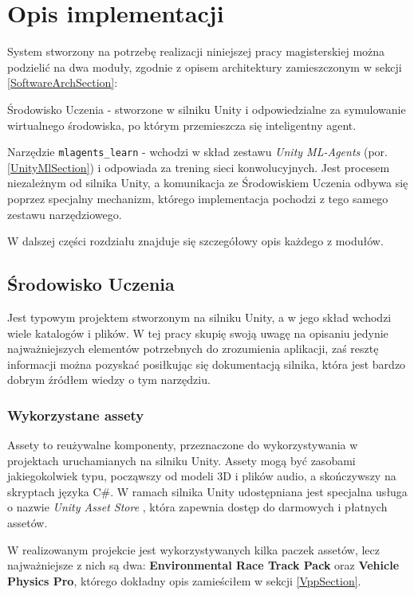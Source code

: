 \chapter{Opis implementacji}
\label{ImplementationChapter}
System stworzony na potrzebę realizacji niniejszej pracy magisterskiej można podzielić na dwa moduły, zgodnie z opisem architektury zamieszczonym w sekcji \ref{SoftwareArchSection}:
\begin{enumerate*}
\item Środowisko Uczenia - stworzone w silniku Unity i odpowiedzialne za symulowanie wirtualnego środowiska, po którym przemieszcza się inteligentny agent.
\item Narzędzie \texttt{mlagents\_learn} - wchodzi w skład zestawu \textit{Unity ML-Agents} (por. \ref{UnityMlSection}) i odpowiada za trening sieci konwolucyjnych. Jest procesem niezależnym od silnika Unity, a komunikacja ze Środowiskiem Uczenia odbywa się poprzez specjalny mechanizm, którego implementacja pochodzi z tego samego zestawu narzędziowego.
\end{enumerate*}

W dalszej części rozdziału znajduje się szczegółowy opis każdego z modułów.

\section{Środowisko Uczenia}
Jest typowym projektem stworzonym na silniku Unity, a w jego skład wchodzi wiele katalogów i plików. W tej pracy skupię swoją uwagę na opisaniu jedynie najważniejszych elementów potrzebnych do zrozumienia aplikacji, zaś resztę informacji można pozyskać posiłkując się dokumentacją silnika, która jest bardzo dobrym źródłem wiedzy o tym narzędziu.

\subsection{Wykorzystane assety}
Assety to reużywalne komponenty, przeznaczone do wykorzystywania w projektach uruchamianych na silniku Unity. Assety mogą być zasobami jakiegokolwiek typu, począwszy od modeli 3D i plików audio, a skończywszy na skryptach języka C\#. W ramach silnika Unity udostępniana jest specjalna usługa o nazwie \textit{Unity Asset Store} \cite{unity:assetStore}, która zapewnia dostęp do darmowych i płatnych assetów.

W realizowanym projekcie jest wykorzystywanych kilka paczek assetów, lecz najważniejsze z nich są dwa: \textbf{Environmental Race Track Pack} oraz \textbf{Vehicle Physics Pro}, którego dokładny opis zamieściłem w sekcji \ref{VppSection}.

